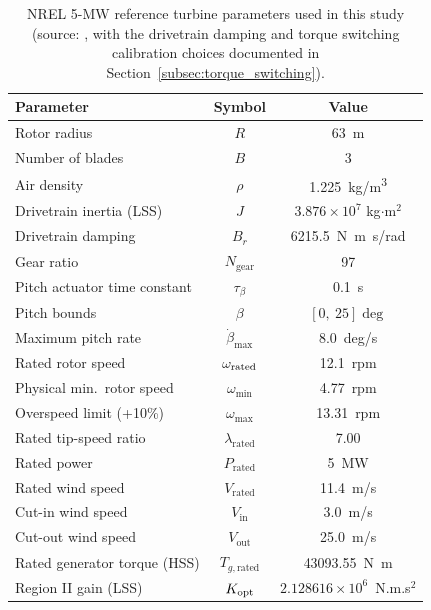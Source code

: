 \begin{table}[H]
\centering
\caption{NREL 5-MW reference turbine parameters used in this study
(source: \citet{jonkman2009}, with the drivetrain damping and torque
switching calibration choices documented in Section~\ref{subsec:torque_switching}).}
\label{tab:turbine_params}
\begin{tabular}{lcc}
\toprule
Parameter & Symbol & Value \\
\midrule
Rotor radius              & $R$                 & \SI{63}{m} \\
Number of blades          & $B$                 & 3 \\
Air density                & $\rho$              & \SI{1.225}{kg/m^3} \\
Drivetrain inertia (LSS)   & $J$                 & $3.876\times10^{7}$ kg$\cdot$m$^2$ \\
Drivetrain damping         & $B_r$               & \SI{6215.5}{N.m.s/rad} \\
Gear ratio                 & $N_{\text{gear}}$   & 97 \\
Pitch actuator time constant & $\tau_\beta$      & \SI{0.1}{s} \\
Pitch bounds                & $\beta$             & $[0,\ 25]\deg$ \\
Maximum pitch rate          & $\dot\beta_{\max}$  & \SI{8.0}{deg/s} \\
Rated rotor speed          & $\omega_{\text{rated}}$       & \SI{12.1}{rpm} \\
Physical min.\ rotor speed & $\omega_{\min}$     & \SI{4.77}{rpm} \\
Overspeed limit (+10\%)    & $\omega_{\max}$     & \SI{13.31}{rpm} \\
Rated tip-speed ratio       & $\lambda_{\text{rated}}$ & 7.00 \\
Rated power                & $P_{\text{rated}}$  & \SI{5}{MW} \\
Rated wind speed           & $V_{\text{rated}}$  & \SI{11.4}{m/s} \\
Cut-in wind speed          & $V_{\text{in}}$     & \SI{3.0}{m/s} \\
Cut-out wind speed         & $V_{\text{out}}$    & \SI{25.0}{m/s} \\
Rated generator torque (HSS) & $T_{g,\text{rated}}$ & \SI{43093.55}{N.m} \\
Region II gain (LSS)        & $K_{\text{opt}}$             & $2.128616\times10^{6}$~N.m.s$^2$ \\
\bottomrule
\end{tabular}
\end{table}

